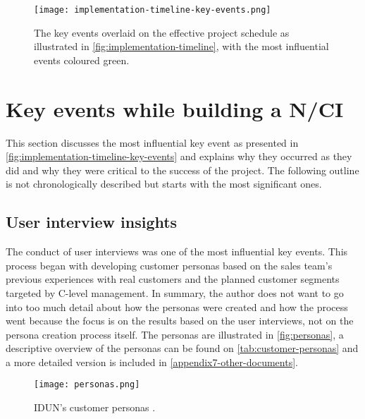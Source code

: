 \begin{figure}[!ht]
  \centering
  \texttt{[image: implementation-timeline-key-events.png]}
  \caption{The key events overlaid on the effective project schedule as illustrated in \autoref{fig:implementation-timeline}, with the most influential events coloured green.}
  \label{fig:implementation-timeline-key-events}
\end{figure}

\section{Key events while building a N/CI}
\label{chapter4-key-events}

This section discusses the most influential key event as presented in \autoref{fig:implementation-timeline-key-events} and explains why they occurred as they did and why they were critical to the success of the project. The following outline is not chronologically described but starts with the most significant ones.

\subsection{User interview insights}
\label{chapter4-user-interview-insights}

The conduct of user interviews was one of the most influential key events. This process began with developing customer personas based on the sales team's previous experiences with real customers and the planned customer segments targeted by C-level management. In summary, the author does not want to go into too much detail about how the personas were created and how the process went because the focus is on the results based on the user interviews, not on the persona creation process itself. The personas are illustrated in \autoref{fig:personas}, a descriptive overview of the personas can be found on \autoref{tab:customer-personas} and a more detailed version is included in \autoref{appendix7-other-documents}.

\begin{figure}[!ht]
  \centering
  \texttt{[image: personas.png]}
  \caption[IDUN's customer personas]{IDUN's customer personas \citep{idun_guardian_nodate}.}
  \label{fig:personas}
\end{figure}

